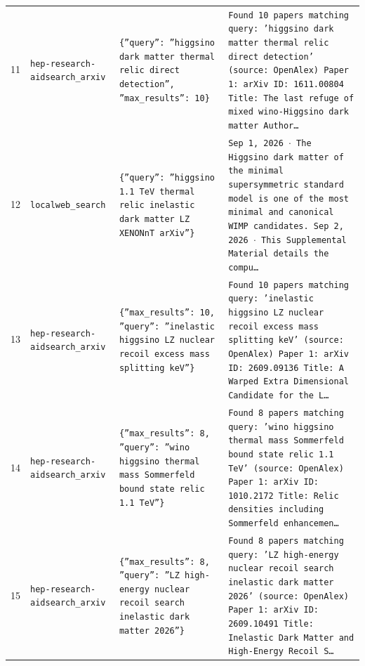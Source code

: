 \documentclass[11pt,a4paper]{article}
\begin{document}
\begin{longtable}{@{}p{}p{}p{}p{}@{}}
11 & \texttt{hep-research-aid}\newline\texttt{search\_\allowbreak{}arxiv} & \texttt{\{''query'':\allowbreak{} ''higgsino dark matter thermal relic direct detection'',\allowbreak{} ''max\_\allowbreak{}results'':\allowbreak{} 10\}\allowbreak{}} & \texttt{Found 10 papers matching query:\allowbreak{} 'higgsino dark matter thermal relic direct detection' (source:\allowbreak{} OpenAlex)\allowbreak{}  Paper 1:\allowbreak{} arXiv ID:\allowbreak{} 1611.00804 Title:\allowbreak{} The last refuge of mixed wino-Higgsino dark matter Author\ldots{}\allowbreak{}} \\
12 & \texttt{local}\newline\texttt{web\_\allowbreak{}search} & \texttt{\{''query'':\allowbreak{} ''higgsino 1.1 TeV thermal relic inelastic dark matter LZ XENONnT arXiv''\}\allowbreak{}} & \texttt{Sep 1,\allowbreak{} 2026 $\cdot$ The Higgsino dark matter of the minimal supersymmetric standard model is one of the most minimal and canonical WIMP candidates. Sep 2,\allowbreak{} 2026 $\cdot$ This Supplemental Material details the compu\ldots{}\allowbreak{}} \\
13 & \texttt{hep-research-aid}\newline\texttt{search\_\allowbreak{}arxiv} & \texttt{\{''max\_\allowbreak{}results'':\allowbreak{} 10,\allowbreak{} ''query'':\allowbreak{} ''inelastic higgsino LZ nuclear recoil excess mass splitting keV''\}\allowbreak{}} & \texttt{Found 10 papers matching query:\allowbreak{} 'inelastic higgsino LZ nuclear recoil excess mass splitting keV' (source:\allowbreak{} OpenAlex)\allowbreak{}  Paper 1:\allowbreak{} arXiv ID:\allowbreak{} 2609.09136 Title:\allowbreak{} A Warped Extra Dimensional Candidate for the L\ldots{}\allowbreak{}} \\
14 & \texttt{hep-research-aid}\newline\texttt{search\_\allowbreak{}arxiv} & \texttt{\{''max\_\allowbreak{}results'':\allowbreak{} 8,\allowbreak{} ''query'':\allowbreak{} ''wino higgsino thermal mass Sommerfeld bound state relic 1.1 TeV''\}\allowbreak{}} & \texttt{Found 8 papers matching query:\allowbreak{} 'wino higgsino thermal mass Sommerfeld bound state relic 1.1 TeV' (source:\allowbreak{} OpenAlex)\allowbreak{}  Paper 1:\allowbreak{} arXiv ID:\allowbreak{} 1010.2172 Title:\allowbreak{} Relic densities including Sommerfeld enhancemen\ldots{}\allowbreak{}} \\
15 & \texttt{hep-research-aid}\newline\texttt{search\_\allowbreak{}arxiv} & \texttt{\{''max\_\allowbreak{}results'':\allowbreak{} 8,\allowbreak{} ''query'':\allowbreak{} ''LZ high-energy nuclear recoil search inelastic dark matter 2026''\}\allowbreak{}} & \texttt{Found 8 papers matching query:\allowbreak{} 'LZ high-energy nuclear recoil search inelastic dark matter 2026' (source:\allowbreak{} OpenAlex)\allowbreak{}  Paper 1:\allowbreak{} arXiv ID:\allowbreak{} 2609.10491 Title:\allowbreak{} Inelastic Dark Matter and High-Energy Recoil S\ldots{}\allowbreak{}} \\

\end{longtable}
\end{document}
